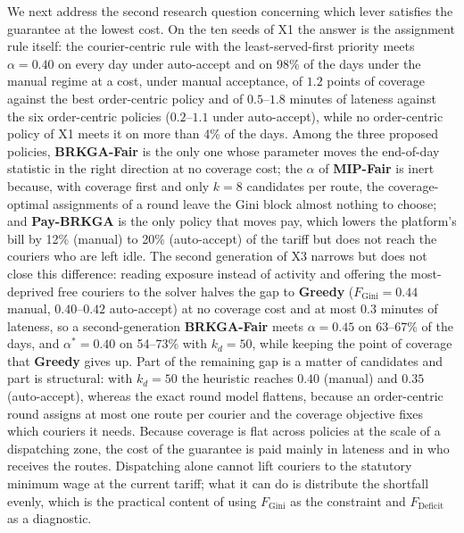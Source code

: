 \documentclass[a4paper,11pt,review,3p,authoryear]{elsarticle}
\newcommand{\FG}{F_{\text{Gini}}}
\newcommand{\FD}{F_{\text{Deficit}}}
\begin{document}
We next address the second research question concerning which lever satisfies the guarantee at the lowest cost. On the ten seeds of X1 the answer is the assignment rule itself: the courier-centric rule with the least-served-first priority meets $\alpha = 0.40$ on every day under auto-accept and on 98\% of the days under the manual regime at a cost, under manual acceptance, of $1.2$ points of coverage against the best order-centric policy and of $0.5$--$1.8$ minutes of lateness against the six order-centric policies ($0.2$--$1.1$ under auto-accept), while no order-centric policy of X1 meets it on more than 4\% of the days. Among the three proposed policies, \textbf{BRKGA-Fair} is the only one whose parameter moves the end-of-day statistic in the right direction at no coverage cost; the $\alpha$ of \textbf{MIP-Fair} is inert because, with coverage first and only $k = 8$ candidates per route, the coverage-optimal assignments of a round leave the Gini block almost nothing to choose; and \textbf{Pay-BRKGA} is the only policy that moves pay, which lowers the platform's bill by 12\% (manual) to 20\% (auto-accept) of the tariff but does not reach the couriers who are left idle. The second generation of X3 narrows but does not close this difference: reading exposure instead of activity and offering the most-deprived free couriers to the solver halves the gap to \textbf{Greedy} ($\FG = 0.44$ manual, $0.40$--$0.42$ auto-accept) at no coverage cost and at most $0.3$ minutes of lateness, so a second-generation \textbf{BRKGA-Fair} meets $\alpha = 0.45$ on 63--67\% of the days, and $\alpha^* = 0.40$ on 54--73\% with $k_d = 50$, while keeping the point of coverage that \textbf{Greedy} gives up. Part of the remaining gap is a matter of candidates and part is structural: with $k_d = 50$ the heuristic reaches $0.40$ (manual) and $0.35$ (auto-accept), whereas the exact round model flattens, because an order-centric round assigns at most one route per courier and the coverage objective fixes which couriers it needs. Because coverage is flat across policies at the scale of a dispatching zone, the cost of the guarantee is paid mainly in lateness and in who receives the routes. Dispatching alone cannot lift couriers to the statutory minimum wage at the current tariff; what it can do is distribute the shortfall evenly, which is the practical content of using $\FG$ as the constraint and $\FD$ as a diagnostic.
\end{document}
